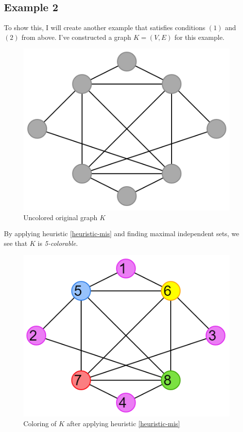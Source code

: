 \documentclass{article}
\newcounter{heuristic} \setcounter{heuristic}{0}
\theoremstyle{definition}
\begin{document}
\subsection*{Example 2}
To show this, I will create another example that satisfies conditions \((1)\) and \((2)\) from above. I've constructed a graph \(K = (V,E)\) for this example.

\begin{figure}[H]
\centering
\includegraphics[scale=0.38]{images/mis-1.png}
\caption{Uncolored original graph \(K\)}
\end{figure}

By applying heuristic \ref{heuristic-mis} and finding maximal independent sets, we see that \(K\) is \emph{5-colorable}.

\begin{figure}[H]
\centering
\includegraphics[scale=0.38]{images/mis-2.png}
\caption{Coloring of \(K\) after applying heuristic \ref{heuristic-mis}}
\end{figure}
\end{document}

